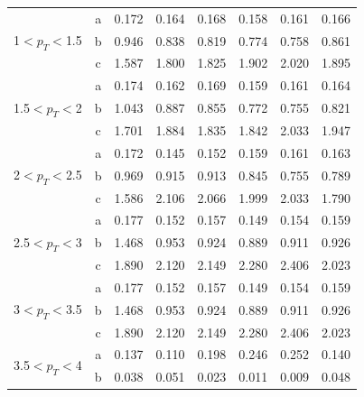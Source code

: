 \begin{small}
\begin{center}
\begin{longtable}{c|c|c|c|c|c|c|c}
\multirow{3}{*}{1$< p_T <$1.5}& a  &0.172 &0.164 &0.168 &0.158 &0.161 &0.166\\
& b  &0.946 &0.838 &0.819 &0.774 &0.758 &0.861\\
& c  &1.587 &1.800 &1.825 &1.902 &2.020 &1.895\\ \hline
\multirow{3}{*}{1.5$< p_T <$2}& a  &0.174 &0.162 &0.169 &0.159 &0.161 &0.164\\
& b  &1.043 &0.887 &0.855 &0.772 &0.755 &0.821\\
& c  &1.701 &1.884 &1.835 &1.842 &2.033 &1.947\\ \hline
\multirow{3}{*}{2$< p_T <$2.5}& a  &0.172 &0.145 &0.152 &0.159 &0.161 &0.163\\
& b  &0.969 &0.915 &0.913 &0.845 &0.755 &0.789\\
& c  &1.586 &2.106 &2.066 &1.999 &2.033 &1.790\\ \hline
\multirow{3}{*}{2.5$< p_T <$3}& a  &0.177 &0.152 &0.157 &0.149 &0.154 &0.159\\
& b  &1.468 &0.953 &0.924 &0.889 &0.911 &0.926\\
& c  &1.890 &2.120 &2.149 &2.280 &2.406 &2.023\\ \hline
\multirow{3}{*}{3$< p_T <$3.5}& a  &0.177 &0.152 &0.157 &0.149 &0.154 &0.159\\
& b  &1.468 &0.953 &0.924 &0.889 &0.911 &0.926\\
& c  &1.890 &2.120 &2.149 &2.280 &2.406 &2.023\\ \hline
\multirow{3}{*}{3.5$< p_T <$4}& a  &0.137 &0.110 &0.198 &0.246 &0.252 &0.140\\
& b  &0.038 &0.051 &0.023 &0.011 &0.009 &0.048\\

\end{longtable}
\end{center}
\end{small}
